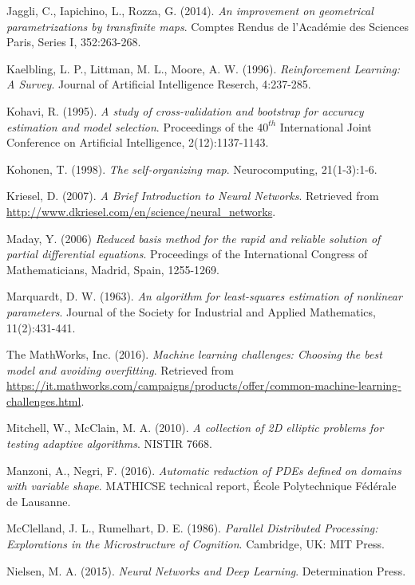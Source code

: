 \documentclass[12pt, a4paper, twoside, openright]{report}
\numberwithin{equation}{chapter}
\theoremstyle{theorem}
\theoremstyle{definition}
\theoremstyle{remark}
\theoremstyle{proposition}
\numberwithin{figure}{chapter}
\begin{document}
\begin{thebibliography}{50}
		Jaggli, C., Iapichino, L., Rozza, G. (2014). \emph{An improvement on geometrical parametrizations by transfinite maps}. Comptes Rendus de l'Acad\'emie des Sciences Paris, Series I, 352:263-268. 
				
		Kaelbling, L. P., Littman, M. L., Moore, A. W. (1996). \emph{Reinforcement Learning: A Survey}. Journal of Artificial Intelligence Reserch, 4:237-285.
		
		Kohavi, R. (1995). \emph{A study of cross-validation and bootstrap for accuracy estimation and model selection}. Proceedings of the $40^{th}$ International Joint Conference on Artificial Intelligence, 2(12):1137-1143.
		
		Kohonen, T. (1998). \emph{The self-organizing map}. Neurocomputing, 21(1-3):1-6.
		
		Kriesel, D. (2007). \emph{A Brief Introduction to Neural Networks}. Retrieved from \url{http://www.dkriesel.com/en/science/neural_networks}.
		
		Maday, Y. (2006) \emph{Reduced basis method for the rapid and reliable solution of partial differential equations}. Proceedings of the International Congress of Mathematicians, Madrid, Spain, 1255-1269.
		
		Marquardt, D. W. (1963). \emph{An algorithm for least-squares estimation of nonlinear parameters}. Journal of the Society for Industrial and Applied Mathematics, 11(2):431-441.
		
		The MathWorks, Inc. (2016). \emph{Machine learning challenges: Choosing the best model and avoiding overfitting}. Retrieved from \url{https://it.mathworks.com/campaigns/products/offer/common-machine-learning-challenges.html}.
		
		Mitchell, W., McClain, M. A. (2010). \emph{A collection of 2D elliptic problems for testing adaptive algorithms}. NISTIR 7668.
		
		Manzoni, A., Negri, F. (2016). \emph{Automatic reduction of PDEs defined on domains with variable shape}. MATHICSE technical report, \'Ecole Polytechnique F\'ed\'erale de Lausanne.
						
		McClelland, J. L., Rumelhart, D. E. (1986). \emph{Parallel Distributed Processing: Explorations in the Microstructure of Cognition}. Cambridge, UK: MIT Press.
		
		Nielsen, M. A. (2015). \emph{Neural Networks and Deep Learning}. Determination Press.
				

\end{thebibliography}
\end{document}
